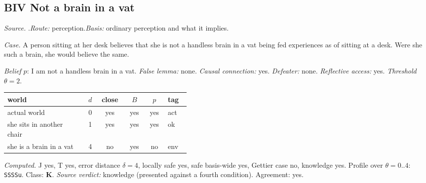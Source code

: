 \subsection*{BIV \enspace Not a brain in a vat}
\noindent\textit{Source.} \citet{Sosa1999}.\quad \textit{Route:} perception.\quad \textit{Basis:} ordinary perception and what it implies.\par
\noindent\textit{Case.} A person sitting at her desk believes that she is not a handless brain in a vat being fed experiences as of sitting at a desk. Were she such a brain, she would believe the same.\par
\noindent\textit{Belief} $p$: I am not a handless brain in a vat.
 \textit{False lemma:} none. \textit{Causal connection:} yes. \textit{Defeater:} none. \textit{Reflective access:} yes. \textit{Threshold} $\theta = 2$.\par
\begin{center}\begin{tabular}{@{}p{0.43\linewidth}rcccl@{}}
world & $d$ & close & $B$ & $p$ & tag \\ \midrule
actual world & 0 & yes & yes & yes & act \\
she sits in another chair & 1 & yes & yes & yes & ok \\
she is a brain in a vat & 4 & no & yes & no & env \\
\end{tabular}\end{center}
\noindent\textit{Computed.} J yes, T yes, error distance $\delta = 4$, locally safe yes, safe basis-wide yes, Gettier case no, knowledge yes. Profile over $\theta = 0..4$: \texttt{SSSSu}. Class: \textbf{K}.
 \textit{Source verdict:} knowledge (presented against a fourth condition). Agreement: yes.
\par\medskip
{}
